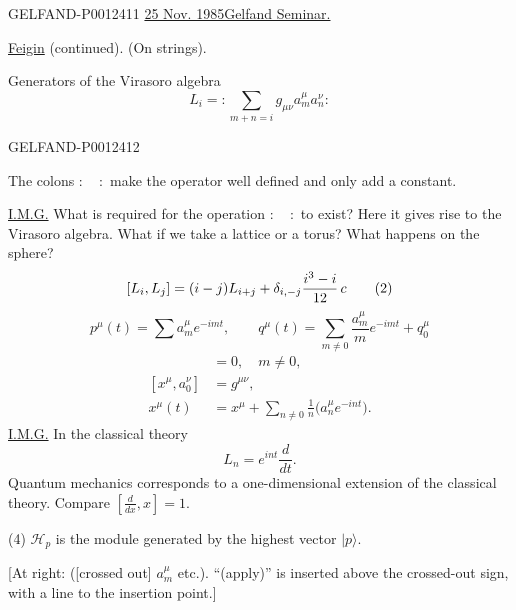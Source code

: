 \begin{GelfandAdjacentEvidence}{GELFAND-P001241}{1}
\underline{25 Nov. 1985}\qquad \underline{Gelfand Seminar.}

\underline{Feigin} (continued). (On strings).

Generators of the Virasoro algebra
\begin{equation*}
L_i=:\sum_{m+n=i}g_{\mu\nu}a_m^\mu a_n^\nu:\tag{1}
\end{equation*}
\end{GelfandAdjacentEvidence}
\begin{GelfandAdjacentEvidence}{GELFAND-P001241}{2}


The colons $:\quad:$ make the operator well defined and only add a constant.

\underline{I.M.G.} What is required for the operation $:\quad:$ to exist? Here it gives rise to the Virasoro algebra. What if we take a lattice or a torus? What happens on the sphere?
\begin{equation*}
\relax [L_i,L_j]=(i-j)L_{i+j}+\delta_{i,-j}\frac{i^3-i}{12}\,c\tag{2}
\end{equation*}
\begin{equation*}
p^\mu(t)=\sum a_m^\mu e^{-imt},\qquad
q^\mu(t)=\sum_{m\ne0}\frac{a_m^\mu}{m}e^{-imt}+q_0^\mu\tag{3}
\end{equation*}
\begin{align*}
[x^\mu,a_m^\nu]&=0,\quad m\ne0,\\[0pt]
[x^\mu,a_0^\nu]&=g^{\mu\nu},\\
x^\mu(t)&=x^\mu+\sum_{n\ne0}\frac1n\bigl(a_n^\mu e^{-int}\bigr).
\end{align*}
\underline{I.M.G.} In the classical theory
\begin{equation*}
L_n=e^{int}\frac{d}{dt}.
\end{equation*}
Quantum mechanics corresponds to a one-dimensional extension of the classical theory. Compare $[\frac{d}{dx},x]=1$.

(4) $\mathcal H_p$ is the module generated by the highest vector $|p\rangle$.

[At right: ([crossed out] $a_m^\mu$ etc.). “(apply)” is inserted above the crossed-out sign, with a line to the insertion point.]
\end{GelfandAdjacentEvidence}
